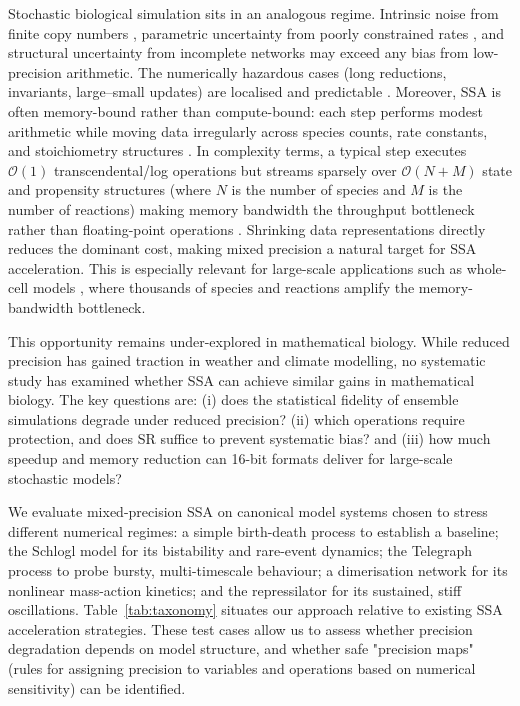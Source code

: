 \documentclass{article}
\begin{document}
Stochastic biological simulation sits in an analogous regime. Intrinsic noise from finite copy numbers \cite{elowitz2002}, parametric uncertainty from poorly constrained rates \cite{gutenkunst2007}, and structural uncertainty from incomplete networks \cite{babtie2014} may exceed any bias from low-precision arithmetic. The numerically hazardous cases (long reductions, invariants, large–small updates) are localised and predictable \cite{connolly2021}. Moreover, SSA is often memory-bound rather than compute-bound: each step performs modest arithmetic while moving data irregularly across species counts, rate constants, and stoichiometry structures \cite{cao2004}. In complexity terms, a typical step executes $\mathcal{O}(1)$ transcendental/log operations but streams sparsely over $\mathcal{O}(N+M)$ state and propensity structures (where $N$ is the number of species and $M$ is the number of reactions) making memory bandwidth the throughput bottleneck rather than floating-point operations \cite{gibson2000,slepoy2008}. Shrinking data representations directly reduces the dominant cost, making mixed precision a natural target for SSA acceleration. This is especially relevant for large-scale applications such as whole-cell models \cite{karr2012}, where thousands of species and reactions amplify the memory-bandwidth bottleneck.

This opportunity remains under-explored in mathematical biology. While reduced precision has gained traction in weather and climate modelling, no systematic study has examined whether SSA can achieve similar gains in mathematical biology. The key questions are: (i) does the statistical fidelity of ensemble simulations degrade under reduced precision? (ii) which operations require protection, and does SR suffice to prevent systematic bias? and (iii) how much speedup and memory reduction can 16-bit formats deliver for large-scale stochastic models?

We evaluate mixed-precision SSA on canonical model systems chosen to stress different numerical regimes: a simple birth-death process to establish a baseline; the Schlogl model for its bistability and rare-event dynamics; the Telegraph process to probe bursty, multi-timescale behaviour; a dimerisation network for its nonlinear mass-action kinetics; and the repressilator for its sustained, stiff oscillations. Table~\ref{tab:taxonomy} situates our approach relative to existing SSA acceleration strategies. These test cases allow us to assess whether precision degradation depends on model structure, and whether safe "precision maps" (rules for assigning precision to variables and operations based on numerical sensitivity) can be identified.
\end{document}
